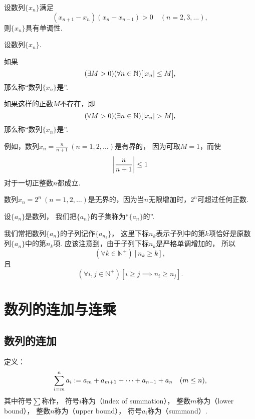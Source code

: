 \begin{proposition}
设数列\(\{x_n\}\)满足\begin{equation*}
	(x_{n+1}-x_n)(x_n-x_{n-1})>0
	\quad(n=2,3,\dotsc),
\end{equation*}
则\(\{x_n\}\)具有单调性.
\end{proposition}

\begin{definition}[数列的有界性]
设数列\(\{x_n\}\).

如果\begin{equation*}
	(\exists M>0)
	(\forall n\in\mathbb{N})
	[\abs{x_n} \leq M],
\end{equation*}
那么称“数列\(\{x_n\}\)是”.

如果这样的正数\(M\)不存在，即\begin{equation*}
	(\forall M>0)
	(\exists n\in\mathbb{N})
	[\abs{x_n} > M],
\end{equation*}
那么称“数列\(\{x_n\}\)是”.
\end{definition}

例如，数列\(x_n = \frac{n}{n+1}\ (n=1,2,\dotsc)\)是有界的，
因为可取\(M=1\)，而使\begin{equation*}
	\abs{\frac{n}{n+1}} \leq 1
\end{equation*}对于一切正整数\(n\)都成立.

数列\(x_n = 2^n\ (n=1,2,\dotsc)\)是无界的，因为当\(n\)无限增加时，\(2^n\)可超过任何正数.

\begin{definition}
设\(\{a_n\}\)是数列，
我们把\(\{a_n\}\)的子集称为“\(\{a_n\}\)的”.
\end{definition}
我们常把数列\(\{a_n\}\)的子列记作\(\{a_{n_k}\}\)，
这里下标\(n_k\)表示子列中的第\(k\)项恰好是原数列\(\{a_n\}\)中的第\(n_k\)项.
应该注意到，由于子列下标\(n_k\)是严格单调增加的，
所以\begin{equation*}
	(\forall k\in\mathbb{N}^+)
	[n_k \geq k],
\end{equation*}
且\begin{equation*}
	(\forall i,j\in\mathbb{N}^+)
	[i \geq j \implies n_i \geq n_j].
\end{equation*}

\section{数列的连加与连乘}
\subsection{数列的连加}
\begin{definition}[连加]
定义：\begin{equation*}
	\sum_{i=m}^n a_i
	:=
	a_m + a_{m+1} + \dotsb + a_{n-1} + a_n
	\quad(m \leq n),
\end{equation*}
其中符号\(\sum\)称作，
符号\(i\)称为（index of summation），
整数\(m\)称为（lower bound），
整数\(n\)称为（upper bound），
符号\(a_i\)称为（summand）.
\end{definition}

